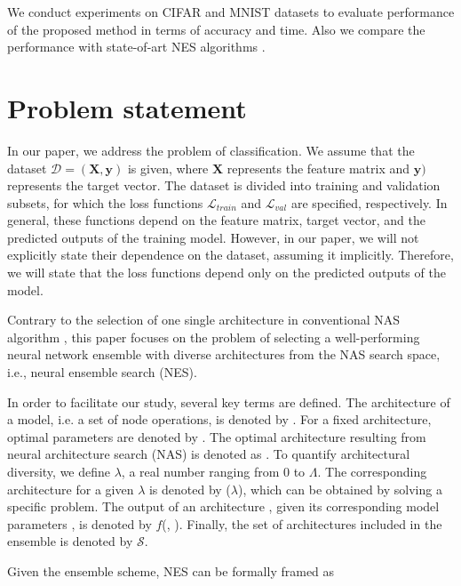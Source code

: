 \documentclass{article}
\begin{document}
We conduct experiments on CIFAR and MNIST datasets to evaluate performance of the proposed method in terms of accuracy and time. Also we compare the performance with state-of-art NES algorithms \citep{nes, baysiannes}.

\section{Problem statement}

In our paper, we address the problem of classification. We assume that the dataset $\mathcal{D} = (\mathbf{X}, \mathbf{y})$ is given, where $\mathbf{X}$ represents the feature matrix and $\mathbf{y})$ represents the target vector. The dataset is divided into training and validation subsets, for which the loss functions $\mathcal{L}_{train}$ and $\mathcal{L}_{val}$ are specified, respectively. In general, these functions depend on the feature matrix, target vector, and the predicted outputs of the training model. However, in our paper, we will not explicitly state their dependence on the dataset, assuming it implicitly. Therefore, we will state that the loss functions depend only on the predicted outputs of the model.

Contrary to the selection of one single architecture in conventional NAS algorithm \citep{darts, enas, nas}, this paper focuses on the problem of selecting a well-performing neural network ensemble with diverse architectures from the NAS search space, i.e., neural ensemble search (NES).

In order to facilitate our study, several key terms are defined. The architecture of a model, i.e. a set of node operations, is denoted by \mbox{\boldmath{$\alpha$}}. For a fixed architecture, optimal parameters are denoted by \mbox{}.
The optimal architecture resulting from neural architecture search (NAS) is denoted as \mbox{\boldmath{$\alpha^*$}}. 
To quantify architectural diversity, we define $\lambda$, a real number ranging from 0 to $\Lambda$.
The corresponding architecture for a given $\lambda$ is denoted by \mbox{\boldmath{$\alpha$}}($\lambda$), which can be obtained by solving a specific problem.
The output of an architecture \mbox{\boldmath{$\alpha$}}, given its corresponding model parameters \mbox{}, is denoted by $f$(\mbox{}, \mbox{\boldmath{$\alpha$}}).
Finally, the set of architectures included in the ensemble is denoted by $\mathcal{S}$.

Given the ensemble scheme, NES can be formally framed as
\end{document}
